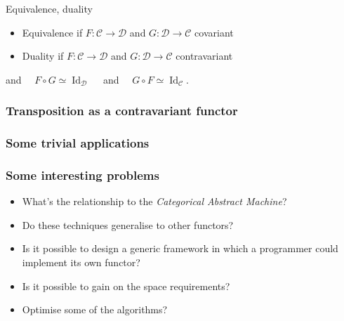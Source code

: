 \documentclass[10pt]{beamer}
\newcommand{\cat}[1]{\mathscr{#1}}
\newcommand{\C}{\cat{C}}
\newcommand{\D}{\cat{D}}
\newcommand{\comp}{\circ}
\DeclareMathOperator{\Id}{Id}
\newcommand{\ra}{\rightarrow}
\begin{document}
\begin{frame}
  \begin{block}{Equivalence, duality}
    \begin{itemize}
    \item Equivalence if $F:\C\ra\D$ and $G:\D\ra\C$ covariant
    \item Duality if $F:\C\ra\D$ and $G:\D\ra\C$ contravariant 
    \end{itemize}
    and $\quad F\comp G \simeq \Id_\D\quad$ and $\quad G\comp F \simeq \Id_\C$.
  \end{block}
\end{frame}


\begin{frame}
  \frametitle{Transposition as a contravariant functor}

\end{frame}


\begin{frame}
  \frametitle{Some trivial applications}

\end{frame}


\begin{frame}
  \frametitle{Some interesting problems}

  \begin{itemize}
  \item What's the relationship to the \emph{Categorical Abstract Machine}?
  \item Do these techniques generalise to other functors?
  \item Is it possible to design a generic framework in which a
    programmer could implement its own functor?
  \item Is it possible to gain on the space requirements?
  \item Optimise some of the algorithms?
  \end{itemize}
\end{frame}

\end{document}
